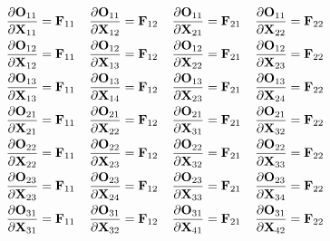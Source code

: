 \begin{align}\label{eq:local_gradients_X}
  \frac{\partial \bold{O}_{11}}{\partial \bold{X}_{11}} = \bold{F}_{11}\;\;\;\;
  \frac{\partial \bold{O}_{11}}{\partial \bold{X}_{12}} = \bold{F}_{12}\;\;\;\;
  \frac{\partial \bold{O}_{11}}{\partial \bold{X}_{21}} = \bold{F}_{21}\;\;\;\;
  \frac{\partial \bold{O}_{11}}{\partial \bold{X}_{22}} = \bold{F}_{22}\;\;\;\;\\
  \frac{\partial \bold{O}_{12}}{\partial \bold{X}_{12}} = \bold{F}_{11}\;\;\;\;
  \frac{\partial \bold{O}_{12}}{\partial \bold{X}_{13}} = \bold{F}_{12}\;\;\;\;
  \frac{\partial \bold{O}_{12}}{\partial \bold{X}_{22}} = \bold{F}_{21}\;\;\;\;
  \frac{\partial \bold{O}_{12}}{\partial \bold{X}_{23}} = \bold{F}_{22}\;\;\;\;\\
  \frac{\partial \bold{O}_{13}}{\partial \bold{X}_{13}} = \bold{F}_{11}\;\;\;\;
  \frac{\partial \bold{O}_{13}}{\partial \bold{X}_{14}} = \bold{F}_{12}\;\;\;\;
  \frac{\partial \bold{O}_{13}}{\partial \bold{X}_{23}} = \bold{F}_{21}\;\;\;\;
  \frac{\partial \bold{O}_{13}}{\partial \bold{X}_{24}} = \bold{F}_{22}\;\;\;\;\\
  \frac{\partial \bold{O}_{21}}{\partial \bold{X}_{21}} = \bold{F}_{11}\;\;\;\;
  \frac{\partial \bold{O}_{21}}{\partial \bold{X}_{22}} = \bold{F}_{12}\;\;\;\;
  \frac{\partial \bold{O}_{21}}{\partial \bold{X}_{31}} = \bold{F}_{21}\;\;\;\;
  \frac{\partial \bold{O}_{21}}{\partial \bold{X}_{32}} = \bold{F}_{22}\;\;\;\;\\
  \frac{\partial \bold{O}_{22}}{\partial \bold{X}_{22}} = \bold{F}_{11}\;\;\;\;
  \frac{\partial \bold{O}_{22}}{\partial \bold{X}_{23}} = \bold{F}_{12}\;\;\;\;
  \frac{\partial \bold{O}_{22}}{\partial \bold{X}_{32}} = \bold{F}_{21}\;\;\;\;
  \frac{\partial \bold{O}_{22}}{\partial \bold{X}_{33}} = \bold{F}_{22}\;\;\;\;\\
  \frac{\partial \bold{O}_{23}}{\partial \bold{X}_{23}} = \bold{F}_{11}\;\;\;\;
  \frac{\partial \bold{O}_{23}}{\partial \bold{X}_{24}} = \bold{F}_{12}\;\;\;\;
  \frac{\partial \bold{O}_{23}}{\partial \bold{X}_{33}} = \bold{F}_{21}\;\;\;\;
  \frac{\partial \bold{O}_{23}}{\partial \bold{X}_{34}} = \bold{F}_{22}\;\;\;\;\\
  \frac{\partial \bold{O}_{31}}{\partial \bold{X}_{31}} = \bold{F}_{11}\;\;\;\;
  \frac{\partial \bold{O}_{31}}{\partial \bold{X}_{32}} = \bold{F}_{12}\;\;\;\;
  \frac{\partial \bold{O}_{31}}{\partial \bold{X}_{41}} = \bold{F}_{21}\;\;\;\;
  \frac{\partial \bold{O}_{31}}{\partial \bold{X}_{42}} = \bold{F}_{22}\;\;\;\;\\

\end{align}
